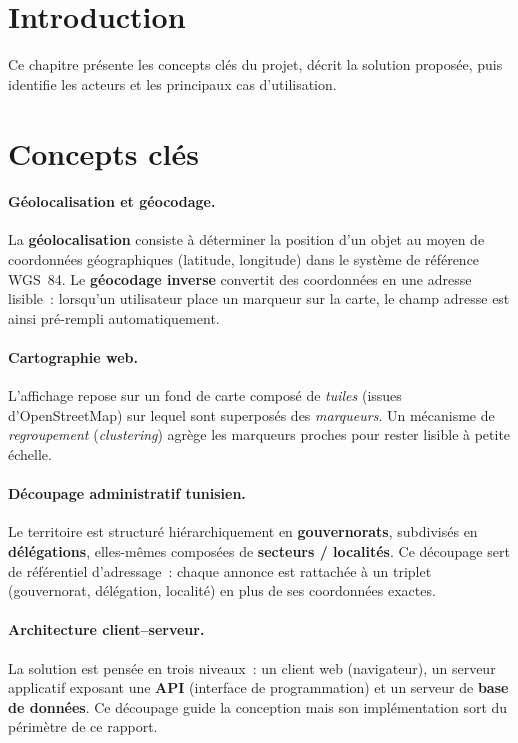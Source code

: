 
\section*{Introduction}
Ce chapitre présente les concepts clés du projet, décrit la solution proposée,
puis identifie les acteurs et les principaux cas d'utilisation.

\section{Concepts clés}
\label{sec:concepts}

\paragraph{Géolocalisation et géocodage.}
La \textbf{géolocalisation} consiste à déterminer la position d'un objet au moyen
de coordonnées géographiques (latitude, longitude) dans le système de référence
WGS~84. Le \textbf{géocodage inverse} convertit des coordonnées en une adresse
lisible~: lorsqu'un utilisateur place un marqueur sur la carte, le champ adresse
est ainsi pré-rempli automatiquement.

\paragraph{Cartographie web.}
L'affichage repose sur un fond de carte composé de \emph{tuiles} (issues
d'OpenStreetMap) sur lequel sont superposés des \emph{marqueurs}. Un mécanisme de
\emph{regroupement} (\emph{clustering}) agrège les marqueurs proches pour rester
lisible à petite échelle.

\paragraph{Découpage administratif tunisien.}
Le territoire est structuré hiérarchiquement en \textbf{gouvernorats},
subdivisés en \textbf{délégations}, elles-mêmes composées de
\textbf{secteurs / localités}. Ce découpage sert de référentiel d'adressage~:
chaque annonce est rattachée à un triplet (gouvernorat, délégation, localité) en
plus de ses coordonnées exactes.

\paragraph{Architecture client--serveur.}
La solution est pensée en trois niveaux~: un client web (navigateur), un serveur
applicatif exposant une \textbf{API} (interface de programmation) et un serveur
de \textbf{base de données}. Ce découpage guide la conception mais son
implémentation sort du périmètre de ce rapport.

